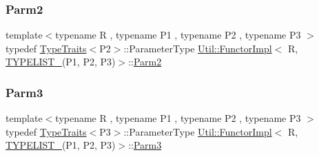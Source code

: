 \mbox{\label{classUtil_1_1FunctorImpl_3_01R_00_01TYPELIST__3_07P1_00_01P2_00_01P3_08_4_a0f99a7ea311c3cc8934098ce9fe769c1}} 
\subsubsection{\texorpdfstring{Parm2}{Parm2}\hspace{0.1cm}{\footnotesize\ttfamily [2/2]}}
{\footnotesize\ttfamily template$<$typename R , typename P1 , typename P2 , typename P3 $>$ \\
typedef \mbox{\hyperlink{classUtil_1_1TypeTraits}{Type\+Traits}}$<$P2$>$\+::Parameter\+Type \mbox{\hyperlink{classUtil_1_1FunctorImpl}{Util\+::\+Functor\+Impl}}$<$ R, \mbox{\hyperlink{install_2include_2adat_2typelist_8h_a0309f68a543c5c0994f9edc0e56dc59f}{T\+Y\+P\+E\+L\+I\+S\+T\+\_}}(P1, P2, P3)$>$\+::\mbox{\hyperlink{structUtil_1_1Private_1_1FunctorImplBase_a554085cd798ef14838a59b528f0feb2e}{Parm2}}}

\mbox{\label{classUtil_1_1FunctorImpl_3_01R_00_01TYPELIST__3_07P1_00_01P2_00_01P3_08_4_a909cd0ef75e4c16e44eb5ae652144d00}} 
\subsubsection{\texorpdfstring{Parm3}{Parm3}\hspace{0.1cm}{\footnotesize\ttfamily [1/2]}}
{\footnotesize\ttfamily template$<$typename R , typename P1 , typename P2 , typename P3 $>$ \\
typedef \mbox{\hyperlink{classUtil_1_1TypeTraits}{Type\+Traits}}$<$P3$>$\+::Parameter\+Type \mbox{\hyperlink{classUtil_1_1FunctorImpl}{Util\+::\+Functor\+Impl}}$<$ R, \mbox{\hyperlink{install_2include_2adat_2typelist_8h_a0309f68a543c5c0994f9edc0e56dc59f}{T\+Y\+P\+E\+L\+I\+S\+T\+\_}}(P1, P2, P3)$>$\+::\mbox{\hyperlink{structUtil_1_1Private_1_1FunctorImplBase_a052148e627fd4caecbcffdbdf1033dbb}{Parm3}}}

